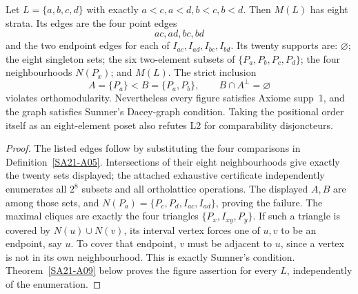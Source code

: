 \begin{counterexample}
\label{SA21-A07}
Let $L=\{a,b,c,d\}$ with exactly $a<c,a<d,b<c,b<d$.
Then $M(L)$ has eight strata. Its edges are the four point edges
\[
 ac,ad,bc,bd
\]
and the two endpoint edges for each of $I_{ac},I_{ad},I_{bc},I_{bd}$.
Its twenty supports are: $\varnothing$; the eight singleton sets;
the six two-element subsets of $\{P_a,P_b,P_c,P_d\}$;
the four neighbourhoods $N(P_x)$; and $M(L)$.
The strict inclusion
\[
 A=\{P_a\}<B=\{P_a,P_b\},\qquad B\cap A^\perp=\varnothing
\]
violates orthomodularity. Nevertheless every figure satisfies
Axiome supp~1, and the graph satisfies Sumner's Dacey-graph condition.
Taking the positional order itself as an eight-element poset also
refutes L2 for comparability disjoncteurs.
\end{counterexample}
\begin{proof}
The listed edges follow by substituting the four comparisons in
Definition~\ref{SA21-A05}. Intersections of their eight neighbourhoods
give exactly the twenty sets displayed; the attached exhaustive
certificate independently enumerates all $2^8$ subsets and all
ortholattice operations. The displayed $A,B$ are among those sets,
and $N(P_a)=\{P_c,P_d,I_{ac},I_{ad}\}$, proving the failure.
The maximal cliques are exactly the four triangles
$\{P_x,I_{xy},P_y\}$. If such a triangle is covered by
$N(u)\cup N(v)$, its interval vertex forces one of $u,v$ to be an
endpoint, say $u$. To cover that endpoint, $v$ must be adjacent to
$u$, since a vertex is not in its own neighbourhood. This is exactly
Sumner's condition. Theorem~\ref{SA21-A09} below proves the figure
assertion for every $L$, independently of the enumeration.
\end{proof}

